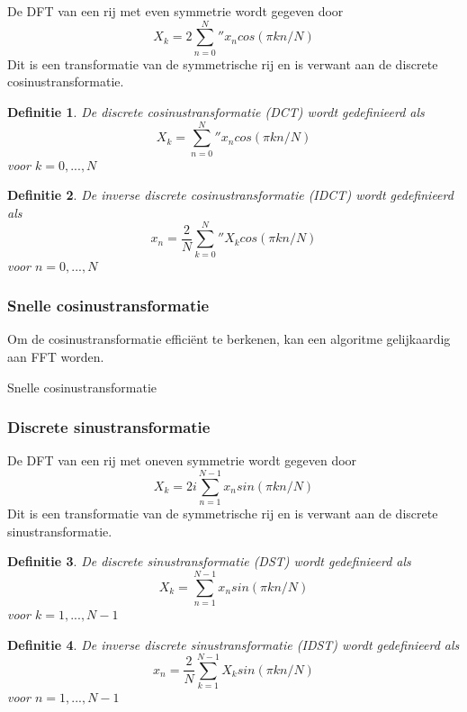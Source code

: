 \documentclass{article}
\newtheorem{mydef}{Definitie}
\begin{document}
	
	De DFT van een rij met even symmetrie wordt gegeven door
	$$
		X_k = 2\sum_{n=0}^{N}{''} x_n cos(\pi kn/N)
	$$
	Dit is een transformatie van de symmetrische rij en is verwant aan de discrete cosinustransformatie.
	
	\begin{mydef}
		De discrete cosinustransformatie (DCT) wordt gedefinieerd als
		$$
			X_k = \sum_{n=0}^{N}{''} x_n cos(\pi kn/N)
		$$
		voor $k=0,...,N$
	\end{mydef}

	\begin{mydef}
		De inverse discrete cosinustransformatie (IDCT) wordt gedefinieerd als
		$$
		x_n = \frac{2}{N}\sum_{k=0}^{N}{''} X_k cos(\pi kn/N)
		$$
		voor $n=0,...,N$
	\end{mydef}

	\subsubsection{Snelle cosinustransformatie}
	
	Om de cosinustransformatie efficiënt te berkenen, kan een algoritme gelijkaardig aan FFT worden.
	

	\begin{algorithm}[!ht]
		\caption{Snelle cosinustransformatie}
		\begin{algorithmic}[1]
			\State 
			\EndProcedure
		\end{algorithmic}
	\end{algorithm}
	
	\subsubsection{Discrete sinustransformatie}
	
	De DFT van een rij met oneven symmetrie wordt gegeven door
	$$
		X_k = 2i\sum_{n=1}^{N-1} x_n sin(\pi kn/N)
	$$
	Dit is een transformatie van de symmetrische rij en is verwant aan de discrete sinustransformatie.	
	\begin{mydef}
		De discrete sinustransformatie (DST) wordt gedefinieerd als
		$$
		X_k = \sum_{n=1}^{N-1} x_n sin(\pi kn/N)
		$$
		voor $k=1,...,N-1$
	\end{mydef}
	
	\begin{mydef}
		De inverse discrete sinustransformatie (IDST) wordt gedefinieerd als
		$$
		x_n = \frac{2}{N}\sum_{k=1}^{N-1} X_k sin(\pi kn/N)
		$$
		voor $n=1,...,N-1$
	\end{mydef}
	
\end{document}
